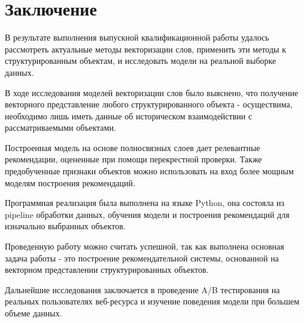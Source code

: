 \chapter*{Заключение} \label{ch-conclusion}

В результате выполнения выпускной квалификационной работы удалось рассмотреть актуальные методы векторизации слов, 
применить эти методы к структурированным объектам, и исследовать модели на реальной выборке данных.

В ходе исследования моделей векторизации слов было выяснено, что получение векторного представление любого структурированного объекта - осуществима, 
необходимо лишь иметь данные об историческом взаимодействии с рассматриваемыми объектами.

Построенная модель на основе полносвязных слоев дает релевантные рекомендации, оцененные при помощи перекрестной проверки.
Также предобученные признаки объектов можно использовать на вход более мощным моделям построения рекомендаций.

Программная реализация была выполнена на языке Python, она состояла из pipeline обработки данных, обучения модели и построения рекомендаций для изначально выбранных объектов.


Проведенную работу можно считать успешной, так как выполнена основная задача работы - это построение рекомендательной системы,
основанной на векторном представлении структурированных объектов. 


Дальнейшие исследования заключается в проведение A/B тестирования на реальных пользователях веб-ресурса и изучение поведения модели при большем объеме данных.
